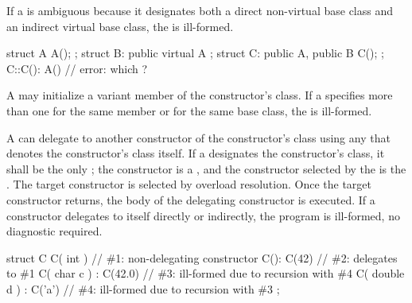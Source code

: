 \pnum
If a
is ambiguous because it designates both a direct non-virtual base class and
an indirect virtual base class, the
is ill-formed.
\begin{example}
\begin{codeblock}
struct A { A(); };
struct B: public virtual A { };
struct C: public A, public B { C(); };
C::C(): A() { }                 // error: which ?
\end{codeblock}
\end{example}

\pnum
A
may initialize a variant member of the
constructor's class.
If a
specifies more than one
for the same member or for the same base class,
the
is ill-formed.

\pnum
A  can delegate to another
constructor of the constructor's class using any
 that denotes the constructor's class itself. If a
 designates the constructor's class,
it shall be the only ; the constructor
is a , and the constructor selected by the
 is the .
The target constructor is selected by overload resolution.
Once the target constructor returns, the body of the delegating constructor
is executed. If a constructor delegates to itself directly or indirectly,
the program is ill-formed, no diagnostic required.
\begin{example}
\begin{codeblock}
struct C {
  C( int ) { }                  // \#1: non-delegating constructor
  C(): C(42) { }                // \#2: delegates to \#1
  C( char c ) : C(42.0) { }     // \#3: ill-formed due to recursion with \#4
  C( double d ) : C('a') { }    // \#4: ill-formed due to recursion with \#3
};
\end{codeblock}
\end{example}

